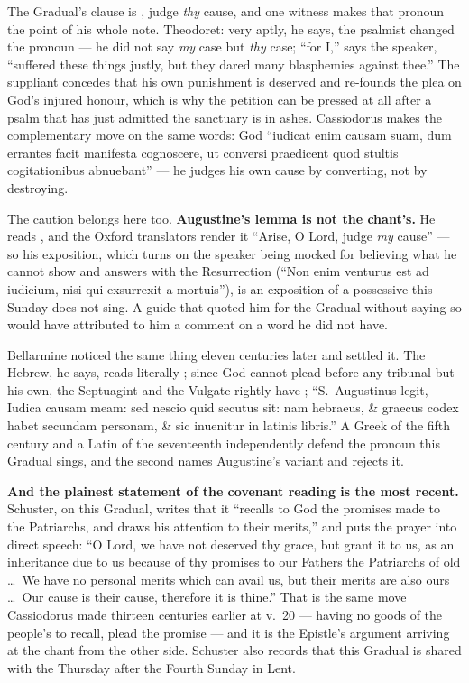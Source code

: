 \begin{witnessnote}
The Gradual's clause is , judge \emph{thy}
cause, and one witness makes that pronoun the point of his whole note.
Theodoret: very aptly, he says, the psalmist changed the pronoun --- he did not
say \textit{my} case but \textit{thy} case; ``for I,'' says the speaker,
``suffered these things justly, but they dared many blasphemies against
thee.'' The suppliant concedes that his own punishment is deserved and
re-founds the plea on God's injured honour, which is why the petition can be
pressed at all after a psalm that has just admitted the sanctuary is in ashes.
Cassiodorus makes the complementary move on the same words: God ``iudicat enim
causam suam, dum errantes facit manifesta cognoscere, ut conversi praedicent
quod stultis cogitationibus abnuebant'' --- he judges his own cause by
converting, not by destroying.

The caution belongs here too. \textbf{Augustine's lemma is not the chant's.} He
reads , and the Oxford
translators render it ``Arise, O Lord, judge \textit{my} cause'' --- so his
exposition, which turns on the speaker being mocked for believing what he
cannot show and answers with the Resurrection (``Non enim venturus est ad
iudicium, nisi qui exsurrexit a mortuis''), is an exposition of a possessive
this Sunday does not sing. A guide that quoted him for the Gradual without
saying so would have attributed to him a comment on a word he did not have.

Bellarmine noticed the same thing eleven centuries later and settled it. The
Hebrew, he says, reads literally ; since God cannot
plead before any tribunal but his own, the Septuagint and the Vulgate rightly
have ; ``S.\ Augustinus legit, Iudica causam meam:
sed nescio quid secutus sit: nam hebraeus, \& graecus codex habet secundam
personam, \& sic inuenitur in latinis libris.'' A Greek of the fifth century
and a Latin of the seventeenth independently defend the pronoun this Gradual
sings, and the second names Augustine's variant and rejects it.
\end{witnessnote}

\textbf{And the plainest statement of the covenant reading is the most
recent.} Schuster, on this Gradual, writes that it ``recalls to God the
promises made to the Patriarchs, and draws his attention to their merits,''
and puts the prayer into direct speech: ``O Lord, we have not deserved thy
grace, but grant it to us, as an inheritance due to us because of thy promises
to our Fathers the Patriarchs of old \dots\ We have no personal merits which
can avail us, but their merits are also ours \dots\ Our cause is their cause,
therefore it is thine.'' That is the same move Cassiodorus made thirteen
centuries earlier at v.~20 --- having no goods of the people's to recall, plead
the promise --- and it is the Epistle's argument arriving at the chant from the
other side. Schuster also records that this Gradual is shared with the Thursday
after the Fourth Sunday in Lent.

